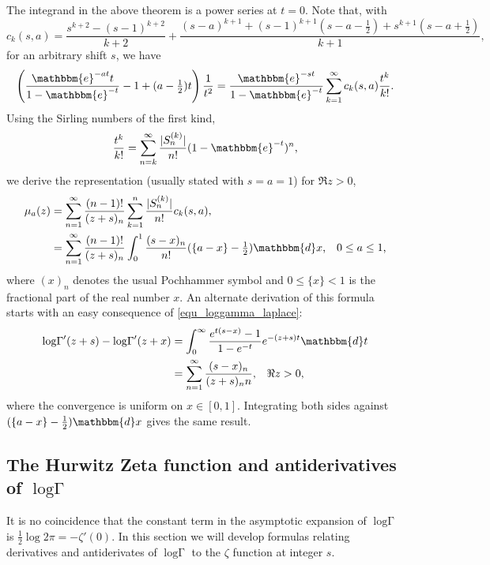 \documentclass[12pt]{article}
\newcommand{\logG} {\operatorname {log \Gamma}}
\newcommand{\ee}[0] {\mathbbm{e}}
\newcommand{\dd}[0] {\mathbbm{d}}
\numberwithin{equation}{section}
\begin{document}
The integrand in the above theorem is a power series at $t=0$. Note that, with
\begin{equation*}
c_k(s,a)=\frac{s^{k+2}-(s-1)^{k+2}}{k+2}+\frac{(s-a)^{k+1}+(s-1)^{k+1}(s-a-\frac{1}{2}) +s^{k+1}(s-a+\frac{1}{2})}{k+1}\text{,}
\end{equation*}
for an arbitrary shift $s$, we have
\begin{equation*}
\left( \frac{ \ee^{-at}t}{1-\ee^{-t}}-1+(a-\tfrac{1}{2})t \right) \frac{1}{t^2} = \frac{\ee^{-s t}}{1-\ee^{-t}} \sum_{k=1}^{\infty} c_k(s,a) \frac{t^k}{k!}\text{.}
\end{equation*}
Using the Sirling numbers of the first kind,
\begin{equation*}
\frac{t^k}{k!} = \sum_{n=k}^{\infty} \frac{| S_n^{(k)}|}{n!} (1-\ee^{-t})^n\text{,}
\end{equation*}
we derive the representation (usually stated with $s=a=1$) for $\Re z > 0$,
\begin{align*}
\mu_a(z) &= \sum_{n=1}^{\infty}\frac{(n-1)!}{(z+s)_n} \sum_{k=1}^{n}\frac{|S_n^{(k)}|}{n!} c_k(s,a) \text{,}\\
&= \sum_{n=1}^{\infty}\frac{(n-1)!}{(z+s)_n} \int_0^1 \frac{(s-x)_n}{n!}  (\{a-x\}-\tfrac{1}{2}) \dd x\text{,} \quad 0 \le a \le 1\text{,}
\end{align*}
where $(x)_n$ denotes the usual Pochhammer symbol and $0 \le \{x\} < 1$ is the fractional part of the real number $x$. An alternate derivation of this formula starts with an easy consequence of \eqref{equ_loggamma_laplace}:
\begin{align*}
\logG'(z+s) - \logG'(z+x) &= \int_{0}^{\infty} \frac{e^{t \left(s-x\right)}-1}{1-e^{-t}} e^{-(z+s)t} \dd t\\
&= \sum_{n=1}^{\infty} \frac{(s-x)_n}{(z+s)_n n} \text{,} \quad \Re z > 0 \text{,}
\end{align*}
where the convergence is uniform on $x \in [0,1]$. Integrating both sides against $(\{a-x\}-\tfrac{1}{2}) \dd x$ gives the same result.

\subsection{The Hurwitz Zeta function and antiderivatives of $\logG$}
It is no coincidence that the constant term in the asymptotic expansion of $\logG$ is $\tfrac{1}{2} \log2\pi = -\zeta'(0)$. In this section we will develop formulas relating derivatives and antiderivates of $\logG$ to the $\zeta$ function at integer $s$.
\end{document}
